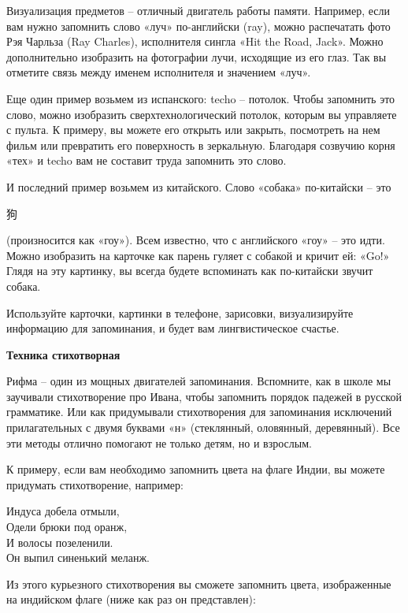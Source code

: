 Визуализация предметов – отличный двигатель работы памяти. Например, если вам нужно запомнить слово «луч» по-английски (ray), можно распечатать фото Рэя Чарльза (Ray Charles), исполнителя сингла «Hit the Road, Jack». Можно дополнительно изобразить на фотографии лучи, исходящие из его глаз. Так вы отметите связь между именем исполнителя и значением «луч».

Еще один пример возьмем из испанского: techo – потолок. Чтобы запомнить это слово, можно изобразить сверхтехнологический потолок, которым вы управляете с пульта. К примеру, вы можете его открыть или закрыть, посмотреть на нем фильм или превратить его поверхность в зеркальную. Благодаря созвучию корня «тех» и techo вам не составит труда запомнить это слово.

И последний пример возьмем из китайского. Слово «собака» по-китайски – это \begin{CJK}{UTF8}{gbsn}狗\end{CJK} (произносится как «гоу»). Всем известно, что с английского «гоу» – это идти. Можно изобразить на карточке как парень гуляет с собакой и кричит ей: «Go!» Глядя на эту картинку, вы всегда будете вспоминать как по-китайски звучит собака.

Используйте карточки, картинки в телефоне, зарисовки, визуализируйте информацию для запоминания, и будет вам лингвистическое счастье.

\textbf{Техника стихотворная}

Рифма – один из мощных двигателей запоминания. Вспомните, как в школе мы заучивали стихотворение про Ивана, чтобы запомнить порядок падежей в русской грамматике. Или как придумывали стихотворения для запоминания исключений прилагательных с двумя буквами «н» (стеклянный, оловянный, деревянный). Все эти методы отлично помогают не только детям, но и взрослым.

К примеру, если вам необходимо запомнить цвета на флаге Индии, вы можете придумать стихотворение, например:

\begin{fancyquotes}
    \begin{flushright}
        Индуса добела отмыли,\\
        Одели брюки под оранж,\\
        И волосы позеленили.\\
        Он выпил синенький меланж.
    \end{flushright}
\end{fancyquotes}

Из этого курьезного стихотворения вы сможете запомнить цвета, изображенные на индийском флаге (ниже как раз он представлен):

